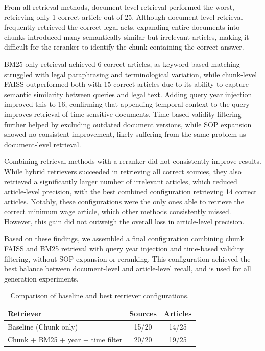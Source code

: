 \documentclass[fleqn,moreauthors,10pt]{ds_report}
\begin{document}
From all retrieval methods, document-level retrieval performed the worst, retrieving only 1 correct article out of 25. Although document-level retrieval frequently retrieved the correct legal acts, expanding entire documents into chunks introduced many semantically similar but irrelevant articles, making it difficult for the reranker to identify the chunk containing the correct answer.

BM25-only retrieval achieved 6 correct articles, as keyword-based matching struggled with legal paraphrasing and terminological variation, while chunk-level FAISS outperformed both with 15 correct articles due to its ability to capture semantic similarity between queries and legal text. Adding query year injection improved this to 16, confirming that appending temporal context to the query improves retrieval of time-sensitive documents. Time-based validity filtering further helped by excluding outdated document versions, while SOP expansion showed no consistent improvement, likely suffering from the same problem as document-level retrieval.

Combining retrieval methods with a reranker did not consistently improve results. While hybrid retrievers succeeded in retrieving all correct sources, they also retrieved a significantly larger number of irrelevant articles, which reduced article-level precision, with the best combined configuration retrieving 14 correct articles. Notably, these configurations were the only ones able to retrieve the correct minimum wage article, which other methods consistently missed. However, this gain did not outweigh the overall loss in article-level precision.

Based on these findings, we assembled a final configuration combining chunk FAISS and BM25 retrieval with query year injection and time-based validity filtering, without SOP expansion or reranking. This configuration achieved the best balance between document-level and article-level recall, and is used for all generation experiments. 

\begin{table}[h]
\centering
\caption{Comparison of baseline and best retriever configurations.}
\begin{tabular}{p{5cm}cc}
\hline
\textbf{Retriever} & \textbf{Sources} & \textbf{Articles} \\
\hline
Baseline (Chunk only) & 15/20 & 14/25 \\
Chunk + BM25 + year + time filter & 20/20 & 19/25 \\
\hline
\end{tabular}
\label{tab:retriever}
\end{table}
\end{document}
